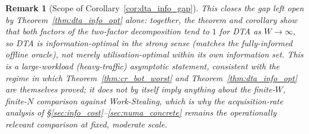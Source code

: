 \documentclass[11pt,a4paper]{article}
\newtheorem{remark}{Remark}[section]
\begin{document}
\begin{remark}[Scope of Corollary~\ref{cor:dta_info_gap}]
This closes the gap left open by Theorem~\ref{thm:dta_info_opt} alone:
together, the theorem and corollary show that \emph{both} factors of the
two-factor decomposition tend to $1$ for DTA as $W \to \infty$, so DTA is
information-optimal in the strong sense (matches the fully-informed
offline oracle), not merely utilisation-optimal within its own
information set. This is a large-workload (heavy-traffic) asymptotic
statement, consistent with the regime in which
Theorem~\ref{thm:cr_bot_worst} and Theorem~\ref{thm:dta_info_opt} are
themselves proved; it does not by itself imply anything about the
finite-$W$, finite-$N$ comparison against Work-Stealing, which is why
the acquisition-rate analysis of \S\ref{sec:info_cost}--\ref{sec:numa_concrete}
remains the operationally relevant comparison at fixed, moderate scale.
\end{remark}
\end{document}

